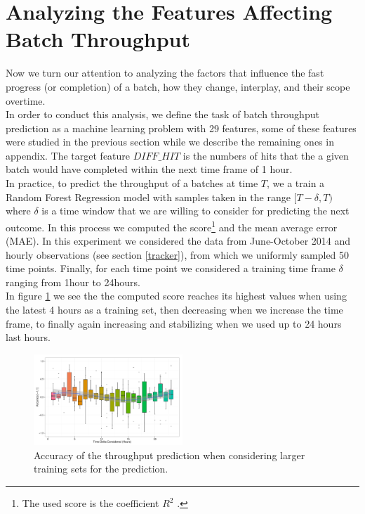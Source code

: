 \section{Analyzing the Features Affecting Batch Throughput}\label{sec:throughput}
Now we turn our attention to analyzing the factors that influence the fast progress (or completion) of a batch, how they change, interplay, and their scope overtime.\\

In order to conduct this analysis, we define the task of batch throughput prediction as a machine learning problem with 29 features, some of these features were studied in the previous section while we describe the remaining ones in appendix. The target feature $DIFF\_HIT$ is the numbers of hits that the a given batch would have completed within the next time frame of 1 hour.\\

In practice, to predict the throughput of a batches at time $T$, we a train a Random Forest Regression model with samples taken in the range $[T-\delta, T)$ where $\delta$ is a time window that we are willing to consider for predicting the next outcome. In this process we computed the score\footnote{The used score is the coefficient $R^2$ \cite{sklearn}.} and the mean average error (MAE).
In this experiment we considered the data from June-October 2014 and hourly observations (see section \ref{tracker}), from which we uniformly sampled 50 time points. Finally, for each time point we considered a training time frame $\delta$ ranging from 1hour to 24hours. \\

In figure \ref{fig:accuracy} we see the the computed score reaches its highest values when using the latest 4 hours as a training set, then decreasing when we increase the time frame, to finally again increasing and stabilizing when we used up to 24 hours last hours.\\

\begin{figure}[htbp]
	\centering
		\includegraphics[width=0.5\textwidth]{figures/ML_accuracy}
	\caption{Accuracy of the throughput prediction when considering larger training sets for the prediction.}
	\label{fig:accuracy}
\end{figure}

